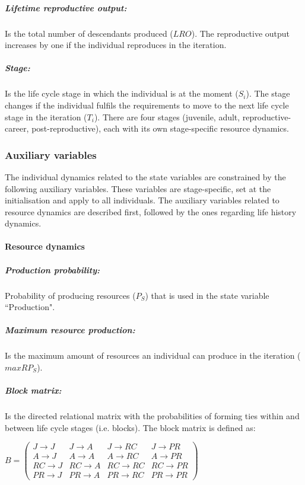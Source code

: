 \documentclass{article}
\begin{document}
\subparagraph{Lifetime reproductive output:}

Is the total number of descendants produced ($LRO$). The reproductive output increases by one if the individual reproduces in the iteration.

\subparagraph{Stage:}

Is the life cycle stage in which the individual is at the moment ($S_i$). The stage changes if the individual fulfils  the requirements to move to the next life cycle stage in the iteration ($T_i$). There are four stages (juvenile, adult, reproductive-career, post-reproductive), each with its own stage-specific resource dynamics.
 
\subsubsection{Auxiliary variables}

The individual dynamics related to the state variables are constrained by the following auxiliary variables. These variables are stage-specific, set at the initialisation and apply to all individuals. The auxiliary variables related to resource dynamics are described first, followed by the ones regarding life history dynamics.

\paragraph{Resource dynamics}

\subparagraph{Production probability:}

Probability of producing resources ($P_S$) that is used in the state variable ``Production".

\subparagraph{Maximum resource production:}

Is the maximum amount of resources an individual can produce in the iteration ($maxRP_S$).

\subparagraph{Block matrix:}

Is the directed relational matrix with the probabilities of forming ties within and between life cycle stages (i.e. blocks). The block matrix is defined as:

$
B=
\begin{pmatrix}
      J \to J & J \to A & J \to RC & J \to PR \\
      A \to J & A \to A & A \to RC & A \to PR \\
      RC \to J & RC \to A & RC \to RC & RC \to PR \\
      PR \to J & PR \to A & PR \to RC & PR \to PR
\end{pmatrix}
$  
\end{document}

